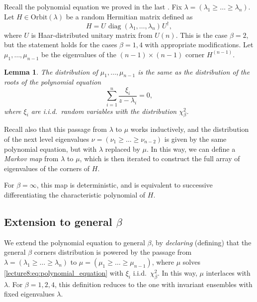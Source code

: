 \documentclass[letterpaper,11pt,oneside,reqno]{book}
\numberwithin{equation}{chapter}  %
\newcommand{\ssp}{\hspace{1pt}}
\newtheorem{lemma}[proposition]{Lemma}
\theoremstyle{definition}
\begin{document}
Recall the polynomial equation we proved in the last .
Fix $\lambda=(\lambda_1\ge \ldots \ge \lambda_n )$.
Let $H\in \mathrm{Orbit}(\lambda)$ be a random Hermitian matrix
defined as
\begin{equation*}
	H=U\ssp \mathrm{\operatorname{diag}}(\lambda_1,\ldots,\lambda_n)\ssp U^\dagger,
\end{equation*}
where $U$ is Haar-distributed unitary matrix from $U(n)$.
This is the case $\beta=2$,
but the statement holds for the cases $\beta=1,4$ with appropriate modifications.
Let $\mu_1,\ldots,\mu_{n-1}$ be the eigenvalues of the $(n-1)\times(n-1)$ corner $H^{(n-1)}$.
\begin{lemma}
	\label{lecture8:lemma:corner_step}
	The distribution of $\mu_1,\ldots,\mu_{n-1}$ is the same as the distribution of
	the roots of the polynomial equation
	\begin{equation}
		\label{lecture8:eq:polynomial_equation}
		\sum_{i=1}^n \frac{\xi_i}{z-\lambda_i}=0,
	\end{equation}
	where $\xi_i$ are i.i.d.\ random variables with the distribution $\chi^2_\beta$.
\end{lemma}
Recall also that this passage from $\lambda$ to $\mu$ works inductively, and
the distribution of the next level eigenvalues $\nu=(\nu_1\ge \ldots \ge \nu_{n-2})$
is given by the same polynomial equation, but with $\lambda$ replaced by $\mu$.
In this way, we can define a \emph{Markov map} from $\lambda$ to $\mu$, which is then iterated
to construct the full array of eigenvalues of the corners of $H$.

For $\beta=\infty$, this map is deterministic, and is equivalent to successive differentiating the
characteristic polynomial of $H$.

\subsection{Extension to general $\beta$}

We extend the polynomial equation to general $\beta$,
by \emph{declaring} (defining) that the general $\beta$ corners distribution
is powered by the passage from $\lambda=(\lambda_1\ge \ldots \ge \lambda_n)$ to $\mu=(\mu_1\ge \ldots \ge \mu_{n-1})$,
where $\mu$ solves \eqref{lecture8:eq:polynomial_equation} with $\xi_i$ i.i.d.\ $\chi^2_\beta$.
In this way, $\mu$ interlaces with $\lambda$.
For $\beta=1,2,4$, this definition reduces to the one with invariant ensembles
with fixed eigenvalues $\lambda$.
\end{document}
